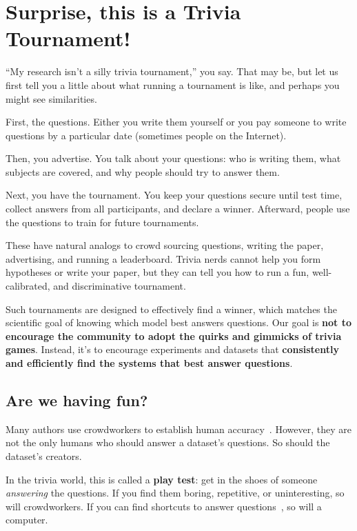 \section{Surprise, this is a Trivia Tournament!}
\label{sec:tournament}


``My research isn't a silly trivia tournament,'' you say.
That may be, but let us first tell you a little about what running a tournament is like, and perhaps you might see similarities.


First, the questions.
Either you write them yourself or you pay someone to write questions by a particular date (sometimes people on the Internet). 

Then, you advertise.  
You talk about your questions:
who is writing them, what subjects are covered, and why people should try to answer them.

Next, you have the tournament. 
You keep your questions secure until test time, collect answers from all participants, and declare a winner. 
Afterward, people use the questions to train for future tournaments.

These have natural analogs to crowd sourcing questions, writing the paper, advertising, and running a leaderboard. 
Trivia nerds cannot help you form hypotheses or write your paper, but they can tell you how to run a fun, well-calibrated, and discriminative tournament.

Such tournaments are designed to effectively find a winner, which matches the scientific goal of knowing which model best answers questions.
Our goal is {\bf not to encourage the  community to adopt the quirks and gimmicks of trivia games}.
Instead, it's to encourage experiments and datasets that {\bf consistently and efficiently find the systems that best answer questions}.

\subsection{Are we having fun?}
\label{sec:fun}

Many authors use crowdworkers to establish human accuracy~\cite{rajpurkar-16,choi-18}.
However, they are not the only humans who should answer a dataset's questions.
So should the dataset's creators.

In the trivia world, this is called a {\bf play test}:
get in the shoes of someone \emph{answering} the questions.
If you find them boring, repetitive, or uninteresting, so will
crowdworkers.
If you can find shortcuts to answer questions~\cite{rondeau-18,
  kaushik-18}, so will a computer.

